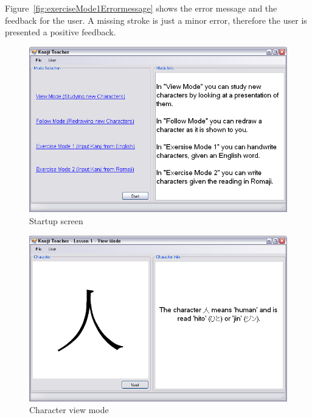 Figure~\ref{fig:exerciseMode1Errormessage} shows the error message and
the feedback for the user. A missing stroke is just a minor error,
therefore the user is presented a positive feedback.

\begin{figure}[htbp]
\begin{center}
\includegraphics[scale=0.7]{images/ConceptualDesign/startupScreen.png}
\caption{Startup screen}
\label{fig:startupScreen}
\end{center}
\end{figure}

\begin{figure}[htbp]
\begin{center}
\includegraphics[scale=0.7]{images/ConceptualDesign/viewMode.png}
\caption{Character view mode}
\label{fig:viewMode}
\end{center}
\end{figure}

